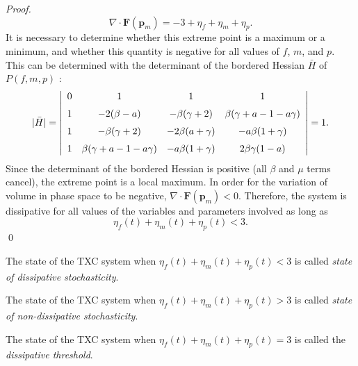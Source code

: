 \begin{proof}
\[		\nabla \cdot \textbf{F}(\textbf{p}_m) = -3+\eta_f+\eta_m+\eta_p.
	\]
	It is necessary to determine whether this extreme point is a maximum or a minimum, and whether this quantity is negative for all values of $f$, $m$, and $p$. This can be determined with the determinant of the bordered Hessian $\bar{H}$ of $P(f,m,p)$ \cite[p. 241]{Marsden:Vector}:
	\[
		|\bar{H}| = 
		\left| 
		\begin {array}{cccc} 
			0		& 1												  & 1								 & 1												  \\\noalign{\medskip}
			1		& -2(\beta-a)							  & -\beta(\gamma+2)	& \beta(\gamma+a-1-a\gamma) \\\noalign{\medskip}
			1		& -\beta(\gamma+2)					& -2\beta(a+\gamma)	& -a\beta(1+\gamma)				  \\\noalign{\medskip}
			1		& \beta(\gamma+a-1-a\gamma)	& -a\beta(1+\gamma)	& 2\beta\gamma(1-a)
		\end {array} 
		\right|
		= 1.
	\]
 	Since the determinant of the bordered Hessian is positive (all $\beta$ and $\mu$ terms cancel), the extreme point is a local maximum. In order for the variation of volume in phase space to be negative, $\nabla \cdot \textbf{F}(\textbf{p}_m) < 0$. Therefore, the system is dissipative for all values of the variables and parameters involved as long as
 	\[
 		\eta_f(t)+\eta_m(t)+\eta_p(t)<3.  
 	\]\qed	
	\end{proof} 
		
	\begin{definition}
		The state of the TXC system when $\eta_f(t)+\eta_m(t)+\eta_p(t)<3$ is called \textit{state of dissipative stochasticity}.  
	\end{definition}
	\begin{definition}
		The state of the TXC system when $\eta_f(t)+\eta_m(t)+\eta_p(t)>3$ is called \textit{state of non-dissipative stochasticity}.  
	\end{definition}
	\begin{definition}
		The state of the TXC system when $\eta_f(t)+\eta_m(t)+\eta_p(t)=3$ is called the \textit{dissipative threshold}.
	\end{definition}

